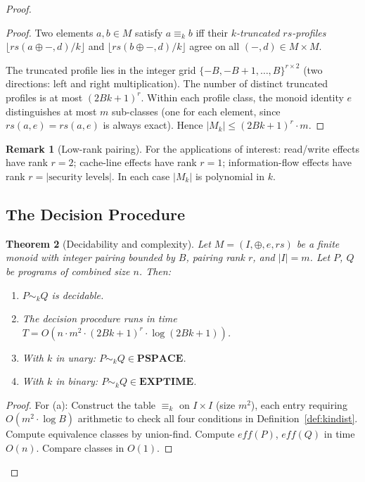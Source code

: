 \documentclass[acmsmall,sigplan,anonymous,review,screen]{acmart}
\theoremstyle{plain}
\newtheorem{theorem}{Theorem}[section]
\theoremstyle{definition}
\newtheorem{remark}[theorem]{Remark}
\newcommand{\rs}{\mathit{rs}}
\begin{document}
\begin{proof}
\begin{proof}
  Two elements $a, b \in M$ satisfy $a \equiv_k b$ iff their
  \emph{$k$-truncated $\rs$-profiles}
  $\lfloor \rs(a \oplus -, d) / k \rfloor$ and
  $\lfloor \rs(b \oplus -, d) / k \rfloor$
  agree on all $(-, d) \in M \times M$.

  The truncated profile lies in the integer grid
  $\{-B, -B+1, \ldots, B\}^{r \times 2}$
  (two directions: left and right multiplication).
  The number of distinct truncated profiles is at most $(2Bk+1)^r$.
  Within each profile class, the monoid identity $e$ distinguishes at
  most $m$ sub-classes (one for each element, since
  $\rs(a, e) = \rs(a, e)$ is always exact).
  Hence $|M_k| \leq (2Bk+1)^r \cdot m$.
\end{proof}

\begin{remark}[Low-rank pairing]
  For the applications of interest:
  read/write effects have rank $r = 2$;
  cache-line effects have rank $r = 1$;
  information-flow effects have rank $r = |\text{security levels}|$.
  In each case $|M_k|$ is polynomial in $k$.
\end{remark}

\subsection{The Decision Procedure}
\label{sec:decidability:procedure}

\begin{theorem}[Decidability and complexity]
\label{thm:decidability}
  Let $M = (I, \oplus, e, \rs)$ be a finite monoid with integer pairing
  bounded by $B$, pairing rank $r$, and $|I| = m$.  Let $P$, $Q$ be
  programs of combined size $n$.  Then:
  \begin{enumerate}[label=(\alph*),itemsep=2pt]
    \item $P \sim_k Q$ is decidable.
    \item The decision procedure runs in time
      $T = O(n \cdot m^2 \cdot (2Bk+1)^r \cdot \log(2Bk+1))$.
    \item With $k$ in unary: $P \sim_k Q \in \mathbf{PSPACE}$.
    \item With $k$ in binary: $P \sim_k Q \in \mathbf{EXPTIME}$.
  \end{enumerate}
\end{theorem}

\begin{proof}
  For (a): Construct the table $\equiv_k$ on $I \times I$ (size $m^2$),
  each entry requiring $O(m^2 \cdot \log B)$ arithmetic to check all
  four conditions in Definition~\ref{def:kindist}.  Compute equivalence
  classes by union-find.  Compute $\mathit{eff}(P)$, $\mathit{eff}(Q)$ in
  time $O(n)$.  Compare classes in $O(1)$.


\end{proof}
\end{proof}
\end{document}
